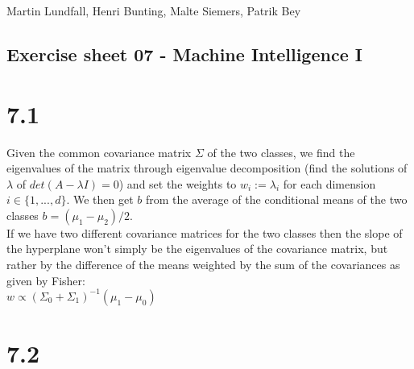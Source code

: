 \documentclass[11pt,a4paper]{article}
\begin{document}
\noindent
Martin Lundfall, Henri Bunting, Malte Siemers, Patrik Bey
\begin{centering}
  \section*{Exercise sheet 07 - Machine Intelligence I}
  \end{centering}
\section*{7.1}
Given the common covariance matrix $\Sigma$ of the two classes, we find the eigenvalues of the matrix through eigenvalue decomposition (find the solutions of $\lambda$ of $det(A - \lambda I)=0$) and set the weights to $w_i := \lambda_i$ for each dimension $i \in \{1,..., d\}$. We then get $b$ from the average of the conditional means of the two classes $b = (\mu_1-\mu_2)/2$.\\
If we have two different covariance matrices for the two classes then the slope of the hyperplane won't simply be the eigenvalues of the covariance matrix, but rather by the difference of the means weighted by the sum of the covariances as given by Fisher:\\
$w \propto (\Sigma_0+\Sigma_1)^{-1}(\mu_1 - \mu_0)$\\
\section*{7.2}
\end{document}
